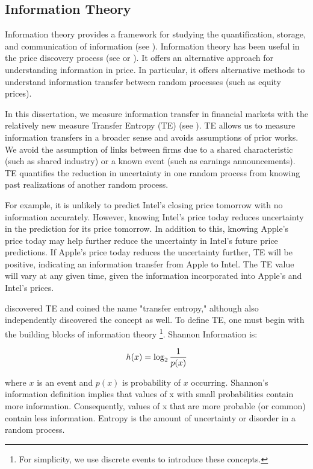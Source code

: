 \subsection{Information Theory } \label{sec:InformationTheory}
Information theory provides a framework for studying the quantification, storage, and communication of information (see \cite{InfoTheoryApplication}).  Information theory has been useful in the price discovery process (see \cite{Billio2012} or \cite{DieboldYilmaz2014}).  It offers an alternative approach for understanding information in price.   In particular,  it offers alternative methods to understand information transfer between random processes (such as equity prices).  

In this dissertation,  we measure information transfer in financial markets with the relatively new measure Transfer Entropy (TE)  (see \cite{IntroToTransferEntropy}).  TE allows us to measure information transfers in a broader sense and avoids assumptions of prior works.  We avoid the assumption of links between firms due to a shared characteristic (such as shared industry) or a known event (such as earnings announcements).   TE quantifies the reduction in uncertainty in one random process from knowing past realizations of another random process.  

For example, it is unlikely to predict Intel's closing price tomorrow with no information accurately.  However, knowing Intel's price today reduces uncertainty in the prediction for its price tomorrow.  In addition to this, knowing Apple's price today may help further reduce the uncertainty in Intel's future price predictions.  If Apple's price today reduces the uncertainty further, TE will be positive, indicating an information transfer from Apple to Intel.   The TE value will vary at any given time, given the information incorporated into Apple's and Intel's prices.

\cite{IntroToTransferEntropy} discovered TE and coined the name "transfer entropy," although  \cite{IntroToTransferEntropy2} also independently discovered the concept as well.  To define TE, one must begin with the building blocks of information theory \footnote{For simplicity, we use discrete events to introduce these concepts.}.  Shannon Information is: 

\begin{equation}
\label{{eq:shannonInfo}}
h(x) = \log_2 \frac{1}{p(x)}
\end{equation}

\noindent where \(x\) is an event and \(p(x)\) is probability of \(x\) occurring. Shannon's information definition implies that values of x with small probabilities contain more information. Consequently, values of x that are more probable (or common) contain less information. Entropy is the amount of uncertainty or disorder in a random process.

